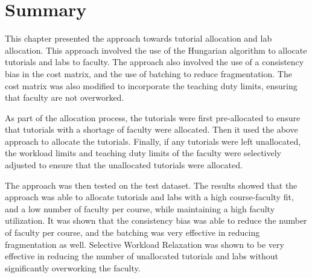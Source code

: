 \begin{table}[H]
  \centering
  \caption{Allocation Results of Selective Workload Relaxation for Labs}
  \label{tab:dynamic_adjustment_labs}
\end{table}

\section{Summary}

This chapter presented the approach towards tutorial allocation and lab allocation. This approach involved the use of the Hungarian algorithm to allocate tutorials and labs to faculty. The approach also involved the use of a consistency bias in the cost matrix, and the use of batching to reduce fragmentation. The cost matrix was also modified to incorporate the teaching duty limits, ensuring that faculty are not overworked.

As part of the allocation process, the tutorials were first pre-allocated to ensure that tutorials with a shortage of faculty were allocated. Then it used the above approach to allocate the tutorials. Finally, if any tutorials were left unallocated, the workload limits and teaching duty limits of the faculty were selectively adjusted to ensure that the unallocated tutorials were allocated.

The approach was then tested on the test dataset. The results showed that the approach was able to allocate tutorials and labs with a high course-faculty fit, and a low number of faculty per course, while maintaining a high faculty utilization. It was shown that the consistency bias was able to reduce the number of faculty per course, and the batching was very effective in reducing fragmentation as well. Selective Workload Relaxation was shown to be very effective in reducing the number of unallocated tutorials and labs without significantly overworking the faculty.
